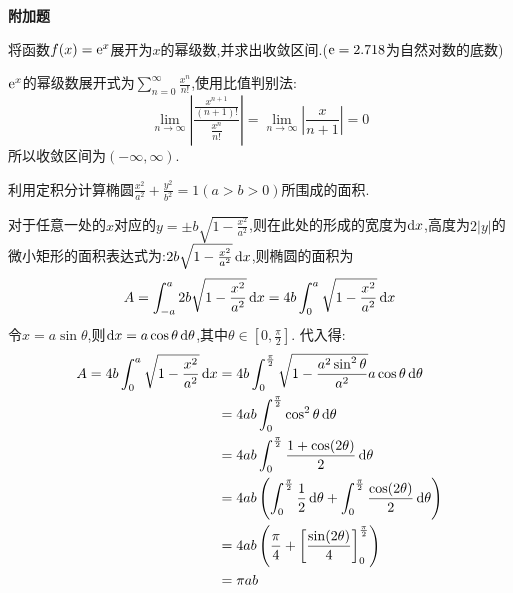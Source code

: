 \begin{questions}
	\begin{center}
		\large\bf 附加题
	\end{center}
	\question 将函数$f(x)=\mathrm{e}^x$展开为$x$的幂级数,并求出收敛区间.($\mathrm{e}=2.718$为自然对数的底数)
	\begin{solution}
		$\mathrm{e}^x$的幂级数展开式为$\displaystyle\sum_{n=0}^{\infty}\frac{x^n}{n!}$,使用比值判别法:
		\begin{equation*}
			\lim_{n\to\infty}\left| \frac{\frac{x^{n+1}}{(n+1)!}}{\frac{x^n}{n!}}\right| =
			\lim_{n\to\infty}\left|\frac{x}{n+1}\right|
			= 0
		\end{equation*}
		所以收敛区间为$(-\infty, \infty)$.
	\end{solution}

	\question 利用定积分计算椭圆$\frac{x^2}{a^2} + \frac{y^2}{b^2} = 1 (a > b > 0)$所围成的面积.
	\begin{solution}
		对于任意一处的$x$对应的$y=\pm b\sqrt{1 -
				\frac{x^2}{a^2}}$,则在此处的形成的宽度为$\mathop{}\!\mathrm{d}x$,高度为$2|y|$的微小矩形的面积表达式为:$2b\sqrt{1-\frac{x^2}{a^2}}\mathop{}\!\mathrm{d}x$,则椭圆的面积为
		\begin{equation*}
			A = \int_{-a}^{a}2b\sqrt{1-\frac{x^2}{a^2}}\mathop{}\!\mathrm{d}x = 4b\int_{0}^{a}\sqrt{1-\frac{x^2}{a^2}}\mathop{}\!\mathrm{d}x
		\end{equation*}
		令$x=a\sin\theta$,则$\mathop{}\!\mathrm{d}x = a\cos\theta\mathop{}\!\mathrm{d}\theta$,其中$\theta \in [0, \frac\pi2]$.
		代入得:
		\begin{align*}
			A = 4b\int_{0}^{a}\sqrt{1-\frac{x^2}{a^2}}\mathop{}\!\mathrm{d}x
			 & = 4b\int_0^{\frac\pi2}\sqrt{1 -
			\frac{a^2\sin^2\theta}{a^2}}a\cos\theta\mathop{}\!\mathrm{d}\theta                                   \\
			 & = 4ab\int_0^{\frac\pi2}\cos^2\theta\mathop{}\!\mathrm{d}\theta                                    \\
			 & = 4ab\int_0^{\frac\pi2}\frac{1+\cos(2\theta)}{2}\mathop{}\!\mathrm{d}\theta                       \\
			 & = 4ab\left(\int_0^{\frac\pi2}\frac12\mathop{}\!\mathrm{d}\theta +
			 \int_0^{\frac\pi2}\frac{\cos(2\theta)}{2}\mathop{}\!\mathrm{d}\theta\right)                     \\
			 & = 4ab\left(\frac\pi4  + \left[\frac{\sin(2\theta)}{4}\right]_0^{\frac\pi2}\right) \\
			 & = \pi ab
		\end{align*}
	\end{solution}

\end{questions}
